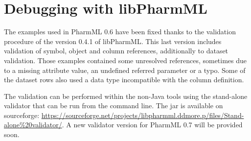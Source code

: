 %

\section{Debugging with libPharmML}
The examples used in PharmML 0.6 have been fixed thanks to the validation procedure 
of the version 0.4.1 of libPharmML. This last version includes validation of symbol, object 
and column references, additionally to dataset validation.  Those examples contained 
some unresolved references, sometimes due to a missing  attribute value, an 
undefined referred parameter or a typo. Some of the dataset rows also used a data 
type incompatible with the column definition.

The validation can be performed within the non-Java tools using the stand-alone 
validator that can be run from the command line. The jar is available on sourceforge: 
\url{https://sourceforge.net/projects/libpharmml.ddmore.p/files/Stand-alone%20validator/}. 
A new validator version for PharmML 0.7 will be provided soon.

